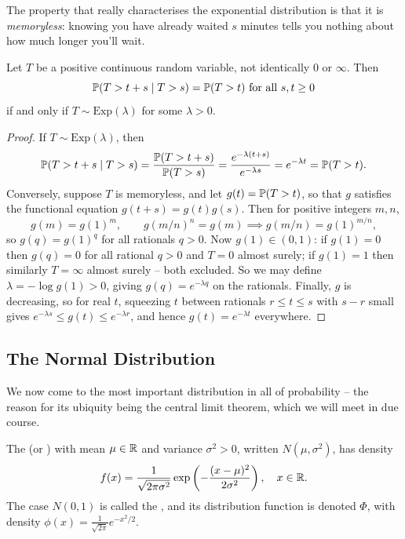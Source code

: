 \documentclass[a4paper]{scrartcl}
\begin{document}
The property that really characterises the exponential distribution is that it is \emph{memoryless}: knowing you have already waited $s$ minutes tells you nothing about how much longer you'll wait.

\begin{theorem}[Memorylessness]
	Let $T$ be a positive continuous random variable, not identically $0$ or $\infty$. Then
	$$
	\mathbb{P}(T > t + s \mid T > s) = \mathbb{P}(T > t) \text{ for all } s, t \geq 0
	$$
	if and only if $T \sim \mathrm{Exp}(\lambda)$ for some $\lambda > 0$.
\end{theorem}
\begin{proof}
	If $T \sim \mathrm{Exp}(\lambda)$, then
	$$
	\mathbb{P}(T > t + s \mid T > s) = \frac{\mathbb{P}(T > t + s)}{\mathbb{P}(T > s)} = \frac{e^{-\lambda(t + s)}}{e^{-\lambda s}} = e^{-\lambda t} = \mathbb{P}(T > t).
	$$
	Conversely, suppose $T$ is memoryless, and let $g(t) = \mathbb{P}(T > t)$, so that $g$ satisfies the functional equation $g(t + s) = g(t)g(s)$. Then for positive integers $m, n$,
	$$
	g(m) = g(1)^m, \qquad g(m/n)^n = g(m) \implies g(m/n) = g(1)^{m/n},
	$$
	so $g(q) = g(1)^q$ for all rationals $q > 0$. Now $g(1) \in (0, 1)$: if $g(1) = 0$ then $g(q) = 0$ for all rational $q > 0$ and $T = 0$ almost surely; if $g(1) = 1$ then similarly $T = \infty$ almost surely -- both excluded. So we may define $\lambda = -\log g(1) > 0$, giving $g(q) = e^{-\lambda q}$ on the rationals. Finally, $g$ is decreasing, so for real $t$, squeezing $t$ between rationals $r \leq t \leq s$ with $s - r$ small gives $e^{-\lambda s} \leq g(t) \leq e^{-\lambda r}$, and hence $g(t) = e^{-\lambda t}$ everywhere.
\end{proof}

\subsection{The Normal Distribution}

We now come to the most important distribution in all of probability -- the reason for its ubiquity being the central limit theorem, which we will meet in due course.

\begin{definition}
	The  (or )  with mean $\mu \in \mathbb{R}$ and variance $\sigma^2 > 0$, written $N(\mu, \sigma^2)$, has density
	$$
	f(x) = \frac{1}{\sqrt{2\pi \sigma^2}} \exp\left(-\frac{(x - \mu)^2}{2\sigma^2}\right), \quad x \in \mathbb{R}.
	$$
	The case $N(0, 1)$ is called the , and its distribution function is denoted $\Phi$, with density $\phi(x) = \frac{1}{\sqrt{2\pi}}e^{-x^2/2}$.
\end{definition}
\end{document}
